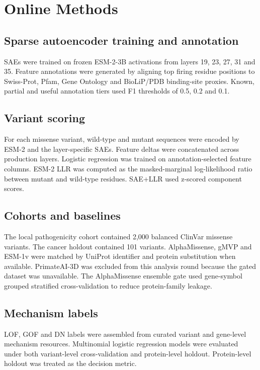 \documentclass[pdflatex,sn-nature]{sn-jnl}
\begin{document}
\section{Online Methods}\label{sec:methods}

\subsection{Sparse autoencoder training and annotation}

SAEs were trained on frozen ESM-2-3B activations from layers 19, 23, 27, 31 and 35. Feature annotations were generated by aligning top firing residue positions to Swiss-Prot, Pfam, Gene Ontology and BioLiP/PDB binding-site proxies. Known, partial and useful annotation tiers used F1 thresholds of 0.5, 0.2 and 0.1.

\subsection{Variant scoring}

For each missense variant, wild-type and mutant sequences were encoded by ESM-2 and the layer-specific SAEs. Feature deltas were concatenated across production layers. Logistic regression was trained on annotation-selected feature columns. ESM-2 LLR was computed as the masked-marginal log-likelihood ratio between mutant and wild-type residues. SAE+LLR used z-scored component scores.

\subsection{Cohorts and baselines}

The local pathogenicity cohort contained 2,000 balanced ClinVar missense variants. The cancer holdout contained 101 variants. AlphaMissense, gMVP and ESM-1v were matched by UniProt identifier and protein substitution when available. PrimateAI-3D was excluded from this analysis round because the gated dataset was unavailable. The AlphaMissense ensemble gate used gene-symbol grouped stratified cross-validation to reduce protein-family leakage.

\subsection{Mechanism labels}

LOF, GOF and DN labels were assembled from curated variant and gene-level mechanism resources. Multinomial logistic regression models were evaluated under both variant-level cross-validation and protein-level holdout. Protein-level holdout was treated as the decision metric.
\end{document}
